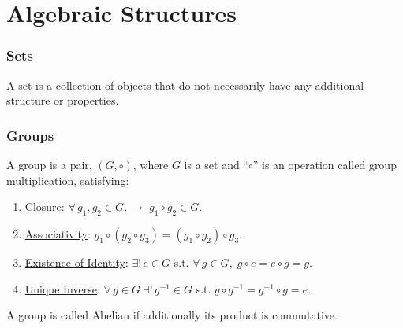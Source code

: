 {
  \begin{frame}
    \titlepage
  \end{frame}
}

\section{Algebraic Structures}

\begin{frame}
  \frametitle{Sets}
  \begin{definition}
    A \alert{set} is a collection of objects that do not necessarily have any additional structure or properties.
  \end{definition}
\end{frame}

\begin{frame}
  \frametitle{Groups}
  \begin{definition}
    A \alert{group} is  a pair, $(G,\circ)$, where $G$ is a set and ``$\circ$'' is an operation called group multiplication, satisfying:
    \begin{enumerate}[I]
    \item \uline{Closure}: $\forall\,g_1,g_2\in G,\rightarrow\;g_1\circ g_2\in G.$
    \item \uline{Associativity}: $g_1\circ (g_2 \circ g_3) = (g_1\circ g_2) \circ g_3.$
    \item \uline{Existence of Identity}: $\exists!\, e\in G$ s.t. $\forall\, g\in G,\; g\circ e= e\circ g = g$.
    \item \uline{Unique Inverse}: $\forall\, g\in G\; \exists!\, g^{-1}\in G$ s.t. $g\circ g^{-1} = g^{-1}\circ g = e.$
    \end{enumerate}
  \end{definition}

  A group is called \alert{Abelian} if additionally its product is commutative.
\end{frame}

